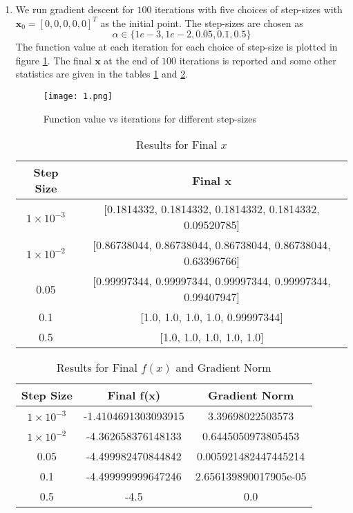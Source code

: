 \documentclass[12pt,a4paper]{article}
\theoremstyle{remark}
\begin{document}
\begin{enumerate}
    \item We run gradient descent for $100$ iterations with five choices of step-sizes with $\mathbf{x}_0 = [0, 0, 0, 0, 0]^T$ as the initial point. The step-sizes are chosen as $$\alpha \in \{1e-3, 1e-2, 0.05, 0.1, 0.5\}$$ The function value at each iteration for each choice of step-size is plotted in figure \ref{fig:f2_value_vs_iterations}. The final $\mathbf{x}$ at the end of $100$ iterations is reported and some other statistics are given in the tables \ref{table:results_final_x} and \ref{table:results_fx_gradient}.
    
    \begin{figure}
        \centering
        \texttt{[image: 1.png]}
        \caption{Function value vs iterations for different step-sizes}
        \label{fig:f2_value_vs_iterations}
    \end{figure}
    
    \begin{table}[ht]
        \centering
        \begin{tabular}{|c|c|}
        \hline
        \textbf{Step Size} & \textbf{Final x} \\
        \hline
        $1 \times 10^{-3}$ & [0.1814332, 0.1814332, 0.1814332, 0.1814332, 0.09520785] \\
        \hline
        $1 \times 10^{-2}$ & [0.86738044, 0.86738044, 0.86738044, 0.86738044, 0.63396766] \\
        \hline
        0.05 & [0.99997344, 0.99997344, 0.99997344, 0.99997344, 0.99407947] \\
        \hline
        0.1 & [1.0, 1.0, 1.0, 1.0, 0.99997344] \\
        \hline
        0.5 & [1.0, 1.0, 1.0, 1.0, 1.0] \\
        \hline
        \end{tabular}
        \caption{Results for Final $x$}
        \label{table:results_final_x}
    \end{table}

    \begin{table}[ht]
        \centering
        \begin{tabular}{|c|c|c|}
        \hline
        \textbf{Step Size} & \textbf{Final f(x)} & \textbf{Gradient Norm} \\
        \hline
        $1 \times 10^{-3}$ & -1.4104691303093915 & 3.39698022503573 \\
        \hline
        $1 \times 10^{-2}$ & -4.362658376148133 & 0.6445050973805453 \\
        \hline
        0.05 & -4.499982470844842 & 0.005921482447445214 \\
        \hline
        0.1 & -4.499999999647246 & 2.656139890017905e-05 \\
        \hline
        0.5 & -4.5 & 0.0 \\
        \hline
        \end{tabular}
        \caption{Results for Final $f(x)$ and Gradient Norm}
        \label{table:results_fx_gradient}
    \end{table}
    

\end{enumerate}
\end{document}
